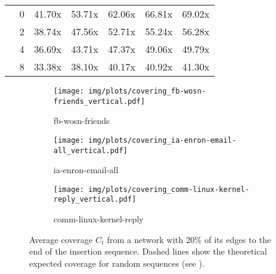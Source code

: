 \begin{table}[ht]
\begin{tabular}{ll|ccccc}
    \midrule[.66pt]
    
    \parbox[t]{2mm}{}
    
    & 0 & 41.70x & 53.71x & 62.06x & 66.81x & 69.02x \\
    & 2 & 38.74x & 47.56x & 52.71x & 55.24x & 56.28x \\
    & 4 & 36.69x & 43.71x & 47.37x & 49.06x & 49.79x \\
    & 8 & 33.38x & 38.10x & 40.17x & 40.92x & 41.30x \\

    \bottomrule

    \end{tabular}
    \label{tab:minhash-time}
\end{table}

\clearpage
\newpage
        

\begin{figure}[h]
    \centering  
    \begin{subfigure}{\linewidth}
        \centering
        \texttt{[image: img/plots/covering\_fb-wosn-friends\_vertical.pdf]}
        \caption{fb-wosn-friends}
        \label{fig:covering_fb2}
    \end{subfigure}
    \hfill %
    \begin{subfigure}{\linewidth}
        \centering
        \texttt{[image: img/plots/covering\_ia-enron-email-all\_vertical.pdf]}
        \caption{ia-enron-email-all}
        \label{fig:covering_enron2}
    \end{subfigure}
    \hfill %
    \begin{subfigure}{\linewidth}
        \centering
        \texttt{[image: img/plots/covering\_comm-linux-kernel-reply\_vertical.pdf]}
        \caption{comm-linux-kernel-reply}
        \label{fig:covering_linux2}
    \end{subfigure}
    \caption{Average coverage $C_t$ from a network with $20\%$ of its edges to the end of the insertion sequence. Dashed lines show the theoretical expected coverage for random sequences (see ).}
    \label{fig:covering-full}
\end{figure}
